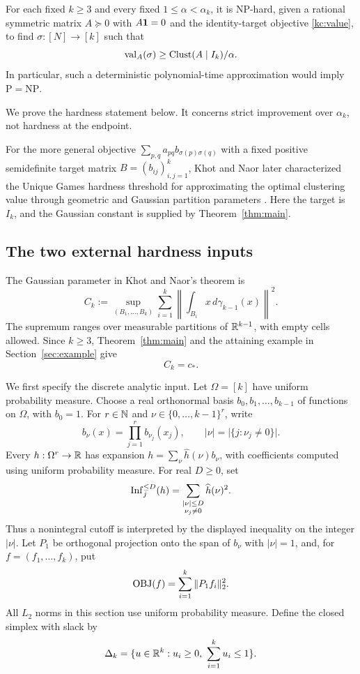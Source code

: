 \begin{theorem}\label{kc:main}
For each fixed \(k\ge3\) and every fixed
\(1\le\alpha<\alpha_k\), it is NP-hard, given a rational symmetric
matrix \(A\succeq0\) with \(A\mathbf 1=0\) and the identity-target
objective \eqref{kc:value}, to find
\(\sigma:[N]\to[k]\) such that
\[
 \operatorname{val}_A(\sigma)\ge\operatorname{Clust}(A\mid I_k)/\alpha.
\]
In particular, such a deterministic polynomial-time approximation
would imply \(\mathrm P=\mathrm{NP}\).
\end{theorem}

We prove the hardness statement below. It concerns strict improvement
over \(\alpha_k\), not hardness at the endpoint.

For the more general objective $\sum_{p,q}a_{pq}b_{\sigma(p)\sigma(q)}$
with a fixed positive semidefinite target matrix $B=(b_{ij})_{i,j=1}^k$,
Khot and Naor later characterized the Unique Games hardness threshold
for approximating the optimal clustering value through geometric and
Gaussian partition parameters
\cite[Theorem~1.1]{KhotNaorSharp}. Here the target is $I_k$, and the
Gaussian constant is supplied by Theorem~\ref{thm:main}.

\subsection{The two external hardness inputs}

The Gaussian parameter in Khot and Naor's theorem is
\[
 C_k:=\sup_{(B_1,\ldots,B_k)}
 \sum_{i=1}^k
 \left\|\int_{B_i}x\,d\gamma_{k-1}(x)\right\|^2.
\]
The supremum ranges over measurable partitions of \(\mathbb R^{k-1}\),
with empty cells allowed. Since \(k\ge3\),
Theorem~\ref{thm:main} and the attaining example in
Section~\ref{sec:example} give
\begin{equation}\label{kc:gaussian-constant}
 C_k=c_*.
\end{equation}

We first specify the discrete analytic input. Let \(\Omega=[k]\) have
uniform probability measure. Choose a real orthonormal basis
\(b_0,b_1,\ldots,b_{k-1}\) of functions on \(\Omega\), with \(b_0=1\).
For \(r\in\mathbb N\) and \(\nu\in\{0,\ldots,k-1\}^r\), write
\[
 b_\nu(x)=\prod_{j=1}^r b_{\nu_j}(x_j),
 \qquad
 |\nu|=\bigl|\{j:\nu_j\ne0\}\bigr|.
\]
Every \(h:\Omega^r\to\mathbb R\) has expansion
\(h=\sum_\nu\widehat h(\nu)b_\nu\), with coefficients computed using
uniform probability measure. For real \(D\ge0\), set
\begin{equation}\label{kc:influence}
 \operatorname{Inf}_j^{\le D}(h)=
 \sum_{\substack{|\nu|\le D\\\nu_j\ne0}}\widehat h(\nu)^2.
\end{equation}
Thus a nonintegral cutoff is interpreted by the displayed inequality
on the integer \(|\nu|\). Let \(P_1\) be orthogonal projection onto
the span of \(b_\nu\) with \(|\nu|=1\), and, for
\(f=(f_1,\ldots,f_k)\), put
\[
 \operatorname{OBJ}(f)=\sum_{i=1}^k\|P_1f_i\|_2^2.
\]
All \(L_2\) norms in this section use uniform probability measure.
Define the closed simplex with slack by
\[
 \Delta_k=\{u\in\mathbb R^k:u_i\ge0,\ \sum_{i=1}^k u_i\le1\}.
\]

